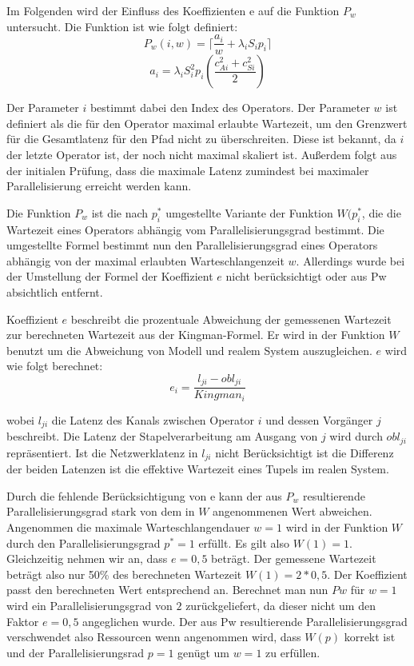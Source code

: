 Im Folgenden wird der Einfluss des Koeffizienten e auf die Funktion \(P_w\) untersucht.
Die Funktion ist wie folgt definiert:
\[P_w(i, w) = \lceil \frac{a_i}{w} + \lambda_i S_i p_i \rceil \]
\[a_i = \lambda_i S^{2}_{i} p_i \left(\frac{{c^{2}_{Ai}} + {c^{2}_{Si}}}{2}\right)\]

Der Parameter \(i\) bestimmt dabei den Index des Operators. 
Der Parameter \(w\) ist definiert als die für den Operator maximal erlaubte Wartezeit, um den Grenzwert für die Gesamtlatenz für den Pfad nicht zu überschreiten.
Diese ist bekannt, da \(i\) der letzte Operator ist, der noch nicht maximal skaliert ist.
Außerdem folgt aus der initialen Prüfung, dass die maximale Latenz zumindest bei maximaler Parallelisierung erreicht werden kann.

Die Funktion \(P_w\) ist die nach \(p_i^\ast\) umgestellte Variante der Funktion \(W(p_i^\ast\), die die Wartezeit eines Operators abhängig vom Parallelisierungsgrad bestimmt. 
Die umgestellte Formel bestimmt nun den Parallelisierungsgrad eines Operators abhängig von der maximal erlaubten Warteschlangenzeit \(w\). 
Allerdings wurde bei der Umstellung der Formel der Koeffizient \(e\) nicht berücksichtigt oder aus Pw absichtlich entfernt. 

Koeffizient \(e\) beschreibt die prozentuale Abweichung der gemessenen Wartezeit zur berechneten Wartezeit aus der Kingman-Formel. 
Er wird in der Funktion \(W\) benutzt um die Abweichung von Modell und realem System auszugleichen.
\(e\) wird wie folgt berechnet:
\[ e_i = \frac{l_{ji} - obl_{ji}}{Kingman_i}\]

wobei \(l_{ji}\) die Latenz des Kanals zwischen Operator \(i\) und dessen Vorgänger \(j\) beschreibt.
Die Latenz der Stapelverarbeitung am Ausgang von \(j\) wird durch \(obl_{ji}\) repräsentiert.
Ist die Netzwerklatenz in \(l_{ji}\) nicht Berücksichtigt ist die Differenz der beiden Latenzen ist die effektive Wartezeit eines Tupels im realen System.

Durch die fehlende Berücksichtigung von e kann der aus \(P_w\) resultierende Parallelisierungsgrad stark von dem in \(W\) angenommenen Wert abweichen. 
Angenommen die maximale Warteschlangendauer \(w = 1 \) wird in der Funktion \(W\) durch den Parallelisierungsgrad \(p^\ast = 1\) erfüllt. 
Es gilt also \(W(1)=1\).
Gleichzeitig nehmen wir an, dass \(e = 0,5\) beträgt. 
Der gemessene Wartezeit beträgt also nur 50\% des berechneten Wartezeit \(W(1) = 2 * 0,5\).
Der Koeffizient passt den berechneten Wert entsprechend an.
Berechnet man nun \(Pw\) für \(w = 1\) wird ein Parallelisierungsgrad von \(2\) zurückgeliefert, da dieser nicht um den Faktor \(e = 0,5\) angeglichen wurde. 
Der aus Pw resultierende Parallelisierungsgrad verschwendet also Ressourcen wenn angenommen wird, dass \(W(p)\) korrekt ist und der Parallelisierungsrad \(p=1\) genügt um \(w = 1\) zu erfüllen.

